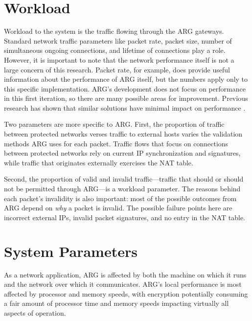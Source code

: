 \section{Workload}
\label{sec:workload}
\par Workload to the system is the traffic flowing through the \ac{ARG} gateways. Standard network traffic parameters like packet rate, packet size, number of simultaneous ongoing connections, and lifetime of connections play a role. However, it is important to note that the network performance itself is not a large concern of this research. Packet rate, for example, does provide useful information about the performance of \ac{ARG} itself, but the numbers apply only to this specific implementation. \ac{ARG}'s development does not focus on performance in this first iteration, so there are many possible areas for improvement. Previous research has shown that similar solutions have minimal impact on performance \cite{NAH}. 

\par Two parameters are more specific to \ac{ARG}. First, the proportion of traffic between protected networks verses traffic to external hosts varies the validation methods \ac{ARG} uses for each packet. Traffic flows that focus on connections between protected networks rely on current \ac{IP} synchronization and signatures, while traffic that originates externally exercises the \ac{NAT} table.

\par Second, the proportion of valid and invalid traffic---traffic that should or should not be permitted through \ac{ARG}---is a workload parameter. The reasons behind each packet's invalidity is also important: most of the possible outcomes from \ac{ARG} depend on \textit{why} a packet is invalid. The possible failure points here are incorrect external \acp{IP}, invalid packet signatures, and no entry in the \ac{NAT} table.

\section{System Parameters}
\label{sec:parameters}
\par As a network application, \ac{ARG} is affected by both the machine on which it runs and the network over which it communicates. \ac{ARG}'s local performance is most affected by processor and memory speeds, with encryption potentially consuming a fair amount of processor time and memory speeds impacting virtually all aspects of operation.

